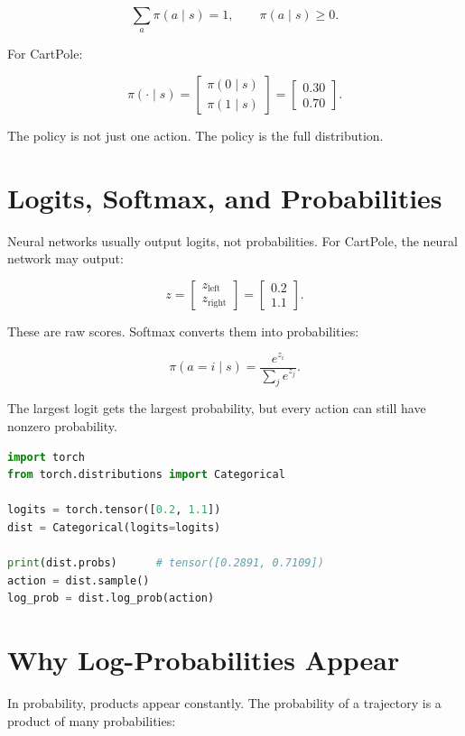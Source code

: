 \documentclass[11pt]{article}
\begin{document}
\[
\sum_a \pi(a \mid s) = 1,
\qquad
\pi(a \mid s) \geq 0.
\]

For CartPole:

\[
\pi(\cdot \mid s)
=
\begin{bmatrix}
\pi(0 \mid s) \\
\pi(1 \mid s)
\end{bmatrix}
=
\begin{bmatrix}
0.30 \\
0.70
\end{bmatrix}.
\]

The policy is not just one action.
The policy is the full distribution.

\section{Logits, Softmax, and Probabilities}

Neural networks usually output logits, not probabilities.
For CartPole, the neural network may output:

\[
z =
\begin{bmatrix}
z_{\text{left}} \\
z_{\text{right}}
\end{bmatrix}
=
\begin{bmatrix}
0.2 \\
1.1
\end{bmatrix}.
\]

These are raw scores.
Softmax converts them into probabilities:

\[
\pi(a=i \mid s)
=
\frac{e^{z_i}}{\sum_j e^{z_j}}.
\]

The largest logit gets the largest probability, but every action can still have nonzero probability.

\begin{lstlisting}[language=Python]
import torch
from torch.distributions import Categorical

logits = torch.tensor([0.2, 1.1])
dist = Categorical(logits=logits)

print(dist.probs)      # tensor([0.2891, 0.7109])
action = dist.sample()
log_prob = dist.log_prob(action)
\end{lstlisting}

\section{Why Log-Probabilities Appear}

In probability, products appear constantly.
The probability of a trajectory is a product of many probabilities:
\end{document}
